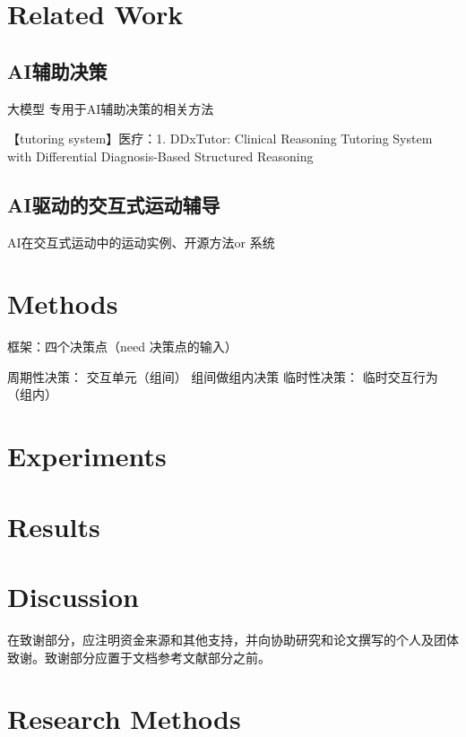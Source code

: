 \documentclass[sigconf]{acmart}
\begin{document}
\section{Related Work}

\subsection{AI辅助决策}

大模型
专用于AI辅助决策的相关方法

【tutoring system】医疗：1. DDxTutor: Clinical Reasoning Tutoring System with Differential Diagnosis-Based Structured Reasoning 

\subsection{AI驱动的交互式运动辅导}

AI在交互式运动中的运动实例、开源方法or 系统

\section{Methods}

框架：四个决策点（need 决策点的输入）

周期性决策：
交互单元（组间） 组间做组内决策
临时性决策：
临时交互行为（组内）

\section{Experiments}

\section{Results}

\section{Discussion}






\begin{acks}
在致谢部分，应注明资金来源和其他支持，并向协助研究和论文撰写的个人及团体致谢。致谢部分应置于文档参考文献部分之前。
\end{acks}





\appendix

\section{Research Methods}
\end{document}
